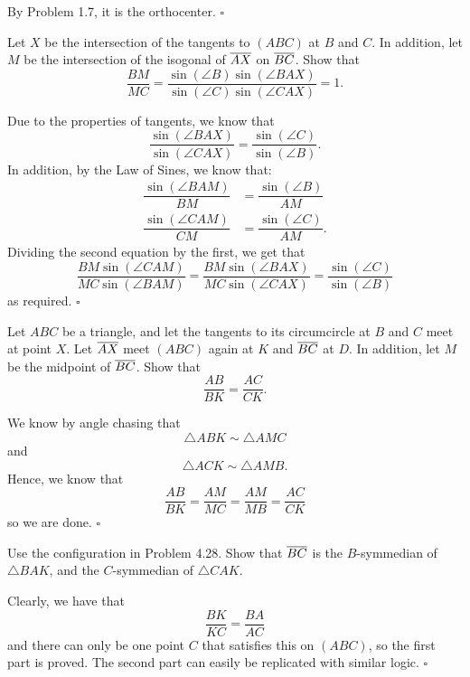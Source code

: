 \documentclass{article}
\begin{document}
By Problem 1.7, it is the orthocenter. $\square$

\begin{problem}[4.25]{}
Let $X$ be the intersection of the tangents to $(ABC)$ at $B$ and $C$. In addition, let $M$ be the intersection of the isogonal of $\overline{AX}$ on $\overline{BC}$. Show that \[\dfrac{BM}{MC} = \dfrac{\sin(\angle B)\sin(\angle BAX)}{\sin(\angle C)\sin(\angle CAX)} = 1.\]
\end{problem}

Due to the properties of tangents, we know that \[\dfrac{\sin(\angle BAX)}{\sin(\angle CAX)} = \dfrac{\sin(\angle C)}{\sin(\angle B)}.\] In addition, by the Law of Sines, we know that:
\begin{align*}
\dfrac{\sin(\angle BAM)}{BM} &= \dfrac{\sin(\angle B)}{AM} \\
\dfrac{\sin(\angle CAM)}{CM} &= \dfrac{\sin(\angle C)}{AM}.
\end{align*}
Dividing the second equation by the first, we get that \[\dfrac{BM\sin(\angle CAM)}{MC\sin(\angle BAM)} = \dfrac{BM\sin(\angle BAX)}{MC\sin(\angle CAX)} = \dfrac{\sin(\angle C)}{\sin(\angle B)}\] as required. $\square$

\begin{problem}[4.28]{}
Let $ABC$ be a triangle, and let the tangents to its circumcircle at $B$ and $C$ meet at point $X$. Let $\overline{AX}$ meet $(ABC)$ again at $K$ and $\overline{BC}$ at $D$. In addition, let $M$ be the midpoint of $\overline{BC}$. Show that \[\dfrac{AB}{BK} = \dfrac{AC}{CK}.\]
\end{problem}

We know by angle chasing that \[\triangle ABK \sim \triangle AMC\] and \[\triangle ACK \sim \triangle AMB.\] Hence, we know that \[\dfrac{AB}{BK} = \dfrac{AM}{MC} = \dfrac{AM}{MB} = \dfrac{AC}{CK}\] so we are done. $\square$

\begin{problem}[4.29]{}
Use the configuration in Problem 4.28. Show that $\overline{BC}$ is the $B$-symmedian of $\triangle BAK$, and the $C$-symmedian of $\triangle CAK$.
\end{problem}

Clearly, we have that \[\dfrac{BK}{KC} = \dfrac{BA}{AC}\] and there can only be one point $C$ that satisfies this on $(ABC)$, so the first part is proved. The second part can easily be replicated with similar logic. $\square$

\newpage
\end{document}
